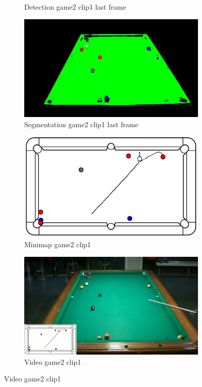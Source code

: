 \begin{figure}[H]
\begin{subfigure}[b]{0.48\textwidth}
		\caption{Detection game2 clip1 last frame}
		\label{fig: game2_clip1_last_frame_detected}
	\end{subfigure}
	\begin{subfigure}[b]{0.48\textwidth}
		\centering
		\includegraphics[width=\textwidth]{images/Segmentation/game2_clip1_segmented_balls_last_frame.jpg}
		\caption{Segmentation game2 clip1 last frame}
		\label{fig: game2_clip1_last_frame_segmented}
	\end{subfigure}
	\begin{subfigure}[b]{0.48\textwidth}
		\centering
		\includegraphics[width=\textwidth]{images/AllMinimap/game2_clip1_minimap.png}
		\caption{Minimap game2 clip1}
		\label{fig: game2_clip1_minimap}
	\end{subfigure}
	\begin{subfigure}[b]{0.48\textwidth}
		\centering
		\includegraphics[width=\textwidth]{images/Video/game2_clip1_video.jpg}
		\caption{Video game2 clip1}
		\label{fig: game2_clip1_video}
	\end{subfigure}


\end{figure}
